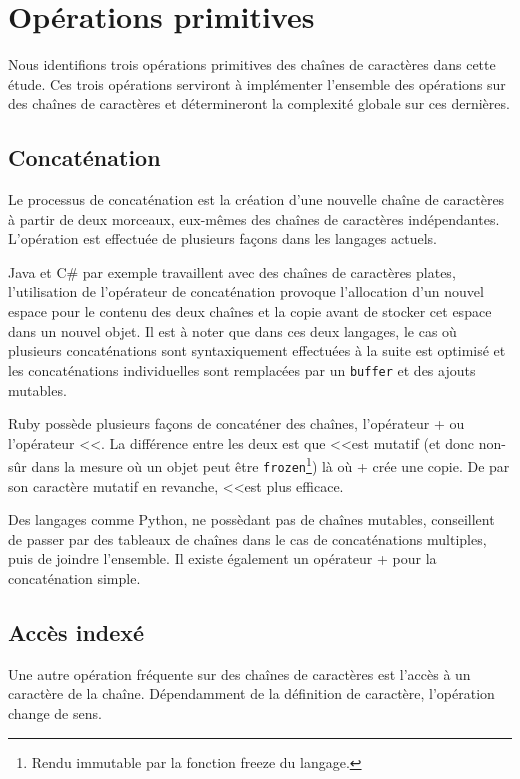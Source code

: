 \section{Opérations primitives}

Nous identifions trois opérations primitives des chaînes de caractères dans cette étude.
Ces trois opérations serviront à implémenter l'ensemble des opérations sur des chaînes
de caractères et détermineront la complexité globale sur ces dernières.

\subsection{Concaténation}

Le processus de concaténation est la création d'une nouvelle chaîne de caractères à partir
de deux morceaux, eux-mêmes des chaînes de caractères indépendantes.
L'opération est effectuée de plusieurs façons dans les langages actuels.

Java et C\# par exemple travaillent avec des chaînes de caractères plates, l'utilisation de
l'opérateur de concaténation provoque l'allocation d'un nouvel espace pour le
contenu des deux chaînes et la copie avant de stocker cet espace dans un nouvel objet.
Il est à noter que dans ces deux langages, le cas où plusieurs concaténations sont syntaxiquement effectuées
à la suite est optimisé et les concaténations individuelles sont remplacées par un \texttt{buffer}
et des ajouts mutables.

Ruby possède plusieurs façons de concaténer des chaînes, l'opérateur + ou l'opérateur \textless\textless.
La différence entre les deux est que \textless\textless est mutatif (et donc non-sûr
dans la mesure où un objet peut être \texttt{frozen}\footnote{Rendu immutable par la fonction freeze du langage.})
là où + crée une copie.
De par son caractère mutatif en revanche, \textless\textless  est plus efficace.

Des langages comme Python, ne possèdant pas de chaînes mutables,
conseillent de passer par des tableaux de chaînes dans le
cas de concaténations multiples, puis de joindre l'ensemble.
Il existe également un opérateur + pour la concaténation simple.

\subsection{Accès indexé}

Une autre opération fréquente sur des chaînes de caractères est l'accès à un caractère
de la chaîne.
Dépendamment de la définition de caractère, l'opération change de sens.

